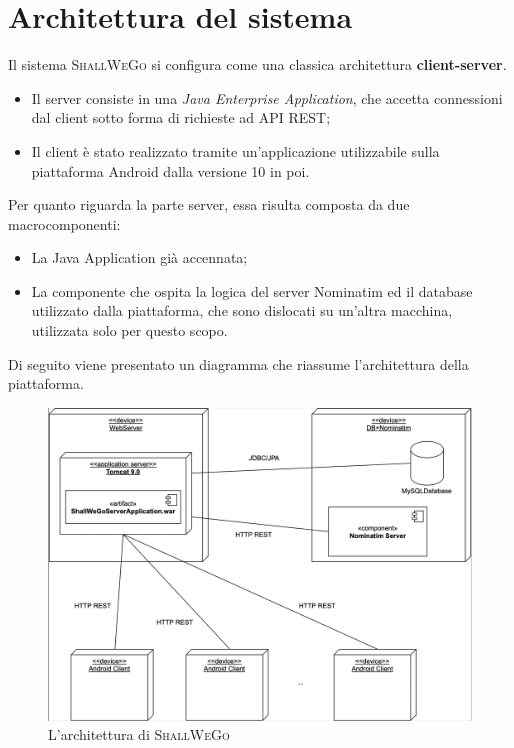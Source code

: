     \newpage

\section{Architettura del sistema}
    Il sistema \textsc{ShallWeGo} si configura come una classica architettura \textbf{client-server}.
    \begin{itemize}
        \item Il server consiste in una \textit{Java Enterprise Application}, che accetta connessioni dal client sotto forma di richieste ad API REST;
        \item Il client è stato realizzato tramite un'applicazione utilizzabile sulla piattaforma Android dalla versione 10 in poi.
    \end{itemize}

    Per quanto riguarda la parte server, essa risulta composta da due macrocomponenti:

    \begin{itemize}
        \item La Java Application già accennata;
        \item La componente che ospita la logica del server Nominatim ed il database utilizzato dalla piattaforma, che sono dislocati su un'altra macchina, utilizzata solo per questo scopo.
    \end{itemize}

    Di seguito viene presentato un diagramma che riassume l'architettura della piattaforma.

    \begin{figure}[H]
        \includegraphics[width=\columnwidth]{capitolo4/figure/Deployment Diagram.png}
        \caption{L'architettura di \textsc{ShallWeGo}}
        \label{L'architettura di ShallWeGo}
    \end{figure}


